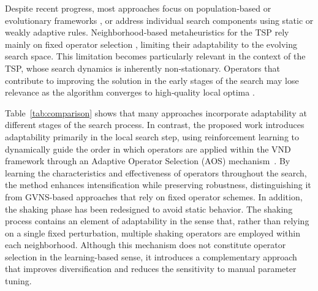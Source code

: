 \documentclass[runningheads]{llncs}
\begin{document}
Despite recent progress, most approaches focus on population‑based or evolutionary frameworks \cite{JEONG2025113930,Alipour2018,ruan2024rlga_tsp}, or address individual search components using static or weakly adaptive rules. Neighborhood‑based metaheuristics for the TSP rely mainly on fixed operator selection \cite{DASILVA2010203,VENKATESH2018189,HORE201883}, limiting their adaptability to the evolving search space. This limitation becomes particularly relevant in the context of the TSP, whose search dynamics is inherently non‑stationary. Operators that contribute to improving the solution in the early stages of the search may lose relevance as the algorithm converges to high‑quality local optima \cite{KARIMIMAMAGHAN2022393}. 


Table~\ref{tab:comparison} shows that many approaches incorporate adaptability at different stages of the search process. In contrast, the proposed work introduces adaptability primarily in the local search step, using reinforcement learning to dynamically guide the order in which operators are applied within the VND framework through an Adaptive Operator Selection (AOS) mechanism~\cite{fialho2010analyzing}. By learning the characteristics and effectiveness of operators throughout the search, the method enhances intensification while preserving robustness, distinguishing it from GVNS-based approaches that rely on fixed operator schemes.
In addition, the shaking phase has been redesigned to avoid static behavior. The shaking process contains an element of adaptability in the sense that, rather than relying on a single fixed perturbation, multiple shaking operators are employed within each neighborhood. Although this mechanism does not constitute operator selection in the learning-based sense, it introduces a complementary approach that improves diversification and reduces the sensitivity to manual parameter tuning.
\end{document}
